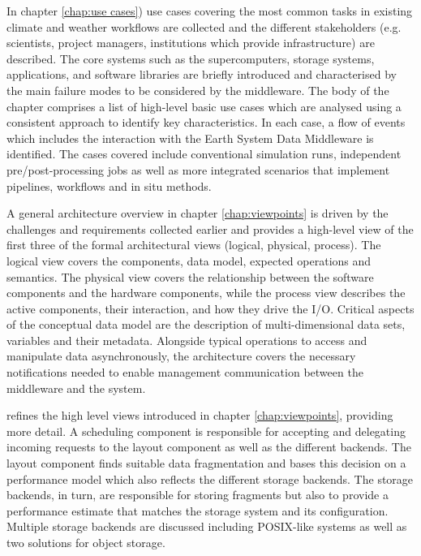 \documentclass[a4paper,11pt]{esiwace-modified}
\begin{document}
In chapter \ref{chap:use cases}) use cases covering the most common tasks in existing climate and weather workflows are collected and
the different stakeholders (e.g. scientists, project managers, institutions which provide infrastructure) are described.
The core systems such as the supercomputers, storage systems, applications, and software libraries are briefly introduced and characterised by the main failure modes to be considered by the middleware.
The body of the chapter comprises a list of high-level basic use cases which are analysed using a consistent approach to identify key characteristics.
In each case, a flow of events which includes the interaction with the Earth System Data Middleware is identified.
The cases covered include conventional simulation runs, independent pre/post-processing jobs as well as more integrated scenarios that implement pipelines, workflows and in situ methods.

A general architecture overview in chapter \ref{chap:viewpoints} is driven by the challenges and requirements collected earlier and provides a high-level view of the first three of the formal architectural views (logical, physical, process).
The logical view covers the components, data model, expected operations and semantics.
The physical view covers the relationship between the software components and the hardware components, while the process view describes the active components, their interaction, and how they drive the I/O.
Critical aspects of the conceptual data model are the description of multi-dimensional data sets, variables and their metadata.
Alongside typical operations to access and manipulate data asynchronously, the architecture covers the necessary notifications needed to enable management communication between the middleware and the system.

 refines the high level views introduced in chapter \ref{chap:viewpoints}, providing more detail.
A scheduling component is responsible for accepting and delegating incoming requests to the layout component as well as the different backends.
The layout component finds suitable data fragmentation and bases this decision on a performance model which also reflects the different storage backends.
The storage backends, in turn, are responsible for storing fragments but also to provide a performance estimate that matches the storage system and its configuration.
Multiple storage backends are discussed including POSIX-like systems as well as two solutions for object storage.
\end{document}
